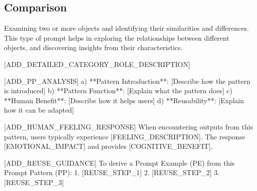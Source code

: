
\subsection{Comparison}
\label{subsec:Comparison}
Examining two or more objects and identifying their similarities and differences. This type of prompt helps in exploring the relationships between different objects, and discovering insights from their characteristics.

[ADD_DETAILED_CATEGORY_ROLE_DESCRIPTION]

[ADD_PP_ANALYSIS]
a) **Pattern Introduction**: [Describe how the pattern is introduced]
b) **Pattern Function**: [Explain what the pattern does]
c) **Human Benefit**: [Describe how it helps users]
d) **Reusability**: [Explain how it can be adapted]

[ADD_HUMAN_FEELING_RESPONSE]
When encountering outputs from this pattern, users typically experience [FEELING_DESCRIPTION]. 
The response [EMOTIONAL_IMPACT] and provides [COGNITIVE_BENEFIT].

[ADD_REUSE_GUIDANCE]
To derive a Prompt Example (PE) from this Prompt Pattern (PP):
1. [REUSE_STEP_1]
2. [REUSE_STEP_2] 
3. [REUSE_STEP_3]


